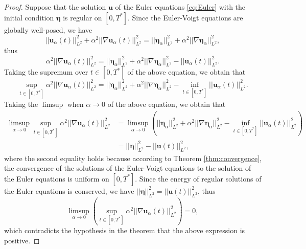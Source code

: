 \documentclass[leqno,10pt,a4paper]{amsart}
\theoremstyle{definition}
\numberwithin{equation}{section}
\newcommand{\bds}{\boldsymbol}
\def\bbeta{\boldsymbol{\eta}}
\begin{document}
\begin{proof}
Suppose that the solution $\bds u$ of the Euler equations \eqref{eq:Euler} with the initial condition $\bbeta$ is regular
on $[0, T^*]$.
Since the Euler-Voigt equations are globally well-posed, we have 
%
\begin{equation}
||\bds u_\alpha(t)||^2_{L^2} + \alpha^2 ||\nabla \bds u_\alpha(t)||^2_{L^2}  = 
||\bbeta_\alpha||^2_{L^2} + \alpha^2 ||\nabla\bbeta_\alpha||^2_{L^2},
\end{equation}
%
thus
%
\begin{equation}
 \alpha^2 ||\nabla \bds u_\alpha(t)||^2_{L^2}  = 
||\bbeta_\alpha||^2_{L^2} + \alpha^2 ||\nabla\bbeta_\alpha||^2_{L^2} - ||\bds u_\alpha(t)||^2_{L^2}.
\end{equation}
%
Taking the supremum over $t\in[0,T^*]$ of the above equation, we obtain that
\begin{equation}
\sup_{t\in[0,T^*]}\alpha^2 ||\nabla \bds u_\alpha(t)||^2_{L^2} = 
||\bbeta_\alpha||^2_{L^2} + \alpha^2 ||\nabla\bbeta_\alpha||^2_{L^2} - \inf_{t\in[0, T^*]} ||\bds u_\alpha(t)||^2_{L^2}.
\end{equation}
%
Taking the $\limsup$ when $\alpha \to 0$ of the above equation, we obtain that
%
\begin{equation}
\begin{aligned}
\limsup_{\alpha\to 0} \sup_{t\in[0,T^*]}\alpha^2 ||\nabla \bds u_\alpha(t)||^2_{L^2} 
&= \limsup_{\alpha\to 0} \left(||\bbeta_\alpha||^2_{L^2} + \alpha^2 ||\nabla\bbeta_\alpha||^2_{L^2} - \inf_{t\in[0, T^*]} ||\bds u_\alpha(t)||^2_{L^2}\right)\\
&= ||\bbeta||^2_{L^2} - ||\bds u(t)||^2_{L^2},
\end{aligned}
\end{equation}
%
where the second equality holds because according to Theorem \ref{thm:convergence}, the convergence of the solutions of the Euler-Voigt equations to the solution of the Euler equations is uniform on $[0, T^*]$.
Since the energy of regular solutions of the Euler equations is conserved, we have $||\bbeta||^2_{L^2} = ||\bds u(t)||^2_{L^2}$, thus
%
\begin{equation}
\limsup_{\alpha\to 0} \left(\sup_{t\in[0,T^*]}\alpha^2 ||\nabla \bds u_\alpha(t)||^2_{L^2} \right)= 0,
\end{equation}
%
which contradicts the hypothesis in the theorem that the above expression is positive.


\end{proof}
 
\end{document}
